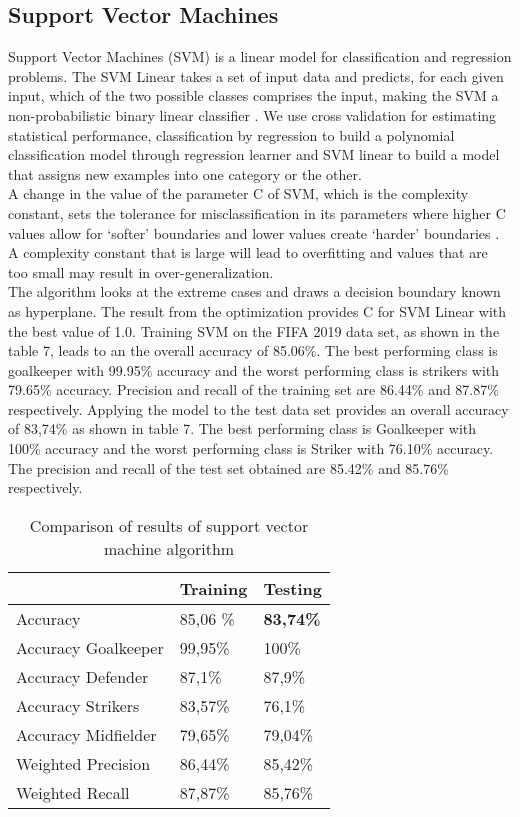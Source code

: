 \subsection{Support Vector Machines}
Support Vector Machines (SVM) is a linear model for classification and regression problems. The SVM Linear takes a set of input data and predicts, for each given input, which of the two possible classes comprises the input, making the SVM a non-probabilistic binary linear classifier \cite{ref_rapidminersvm}.
We use cross validation for estimating statistical performance, classification by regression to build a polynomial classification model through regression learner and SVM linear to build a model that assigns new examples into one category or the other.\\
 A change in the value of the parameter C of SVM, which is the complexity constant, sets the tolerance for misclassification in its parameters where higher C values allow for `softer' boundaries and lower values create `harder' boundaries \cite{ref_rapidminersvm}.  A complexity constant that is large will lead to overfitting and values that are too small may result in over-generalization.\\
The algorithm looks at the extreme cases and draws a decision boundary known as hyperplane. The result from the optimization provides C for SVM Linear with the best value of 1.0. 
Training SVM on the FIFA 2019 data set, as shown in the table 7, leads to an the overall accuracy of 85.06\%. The best performing class is goalkeeper with 99.95\% accuracy and the worst performing class is strikers with 79.65\% accuracy. Precision and recall of the training set are 86.44\% and 87.87\% respectively. 
Applying the model to the test data set provides an overall accuracy of 83,74\% as shown in table 7. The best performing class is Goalkeeper with 100\% accuracy and the worst performing class is Striker with 76.10\% accuracy. The precision and recall of the test set obtained are 85.42\% and 85.76\% respectively. 

\begin{table}[]
\centering
\begin{tabular}{@{}l|ll@{}}
\hline
                    & Training & Testing \\ \hline
Accuracy            & 85,06 \% & \textbf{83,74\%} \\ \hline
Accuracy Goalkeeper & 99,95\%  & 100\%   \\
Accuracy Defender   & 87,1\%   & 87,9\%  \\
Accuracy Strikers   & 83,57\%  & 76,1\%  \\
Accuracy Midfielder & 79,65\%  & 79,04\% \\ \hline
Weighted Precision  & 86,44\%  & 85,42\% \\
Weighted Recall     & 87,87\%  & 85,76\% \\ \hline
\end{tabular}
\label{Tab:SVM}
\caption{Comparison of results of support vector machine algorithm}
\end{table}
